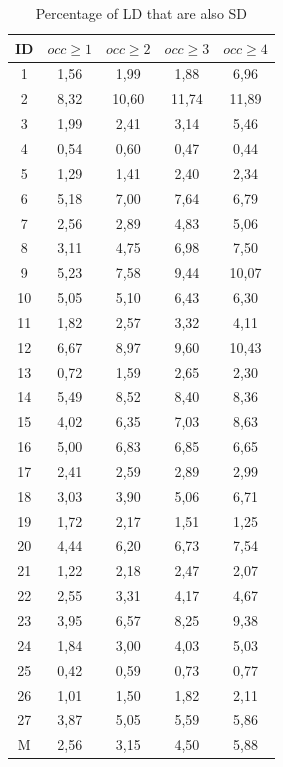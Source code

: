 \documentclass[conference]{IEEEtran}
\begin{document}
\begin{table}[!h]
\renewcommand{\arraystretch}{1.25}
\caption{Percentage of LD that are also SD}
\label{table:sd_percentages}
\centering
\begin{tabular}{|c|c|c|c|c|}
\hline
    ID  & $occ\geq 1$ & $occ\geq 2$ & $occ\geq 3$ & $occ\geq 4$  \\
\hline
1	&	1,56	&	1,99	&	1,88	&	6,96	\\
2	&	8,32	&	10,60	&	11,74	&	11,89	\\
3	&	1,99	&	2,41	&	3,14	&	5,46	\\
4	&	0,54	&	0,60	&	0,47	&	0,44	\\
5	&	1,29	&	1,41	&	2,40	&	2,34	\\
6	&	5,18	&	7,00	&	7,64	&	6,79	\\
7	&	2,56	&	2,89	&	4,83	&	5,06	\\
8	&	3,11	&	4,75	&	6,98	&	7,50	\\
9	&	5,23	&	7,58	&	9,44	&	10,07	\\
10	&	5,05	&	5,10	&	6,43	&	6,30	\\
11	&	1,82	&	2,57	&	3,32	&	4,11	\\
12	&	6,67	&	8,97	&	9,60	&	10,43	\\
13	&	0,72	&	1,59	&	2,65	&	2,30	\\
14	&	5,49	&	8,52	&	8,40	&	8,36	\\
15	&	4,02	&	6,35	&	7,03	&	8,63	\\
16	&	5,00	&	6,83	&	6,85	&	6,65	\\
17	&	2,41	&	2,59	&	2,89	&	2,99	\\
18	&	3,03	&	3,90	&	5,06	&	6,71	\\
19	&	1,72	&	2,17	&	1,51	&	1,25	\\
20	&	4,44	&	6,20	&	6,73	&	7,54	\\
21	&	1,22	&	2,18	&	2,47	&	2,07	\\
22	&	2,55	&	3,31	&	4,17	&	4,67	\\
23	&	3,95	&	6,57	&	8,25	&	9,38	\\
24	&	1,84	&	3,00	&	4,03	&	5,03	\\
25	&	0,42	&	0,59	&	0,73	&	0,77	\\
26	&	1,01	&	1,50	&	1,82	&	2,11	\\
27	&	3,87	&	5,05	&	5,59	&	5,86	\\

\hline
M	&	2,56	&	3,15	&	4,50	&	5,88	\\


\hline
\end{tabular}
\end{table}
\end{document}

